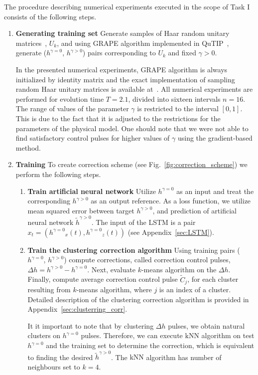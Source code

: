 \documentclass[aps,pra,showkeys,showpacs,notitlepage,superscriptaddress]{revtex4-1}
\newcommand{\1}{{\rm 1\hspace{-0.9mm}l}}
\newcommand{\qutip}{QuTIP\xspace}
\newcommand{\NCP}{\ensuremath{h^{\gamma=0}}\xspace}
\newcommand{\DCP}{\ensuremath{h^{\gamma >0}}\xspace}
\newcommand{\CCP}{\ensuremath{\Delta h}\xspace}
\newcommand{\nnDCP}{\ensuremath{\tilde{h}^{\gamma >0}}\xspace}
\newcommand{\kNN}{\ensuremath{\mathrm{kNN}}\xspace}
\begin{document}
The procedure describing numerical experiments executed in the scope of Task I 
consists of the following steps.
\begin{enumerate}
  \item \textbf{Generating training set}
  Generate samples of Haar random 
  unitary matrices~\cite{mezzadrigenerate,miszczak12generating}, $U_k$, and using GRAPE algorithm implemented in \qutip~\cite{qutip,qutip1,qutip2}, 
  generate (\NCP, \DCP) pairs corresponding to $U_k$ and fixed $\gamma>0$.
  
  In the presented numerical experiments, GRAPE algorithm is always initialized by identity matrix and the exact implementation of sampling random Haar unitary matrices 
  is available at~\cite{qcontrol_lstm_approx}. All numerical experiments are performed for evolution time $T=2.1$, divided into sixteen intervals $n=16$. %
  The range of values of the parameter $\gamma$ is restricted to the interval $[0,1]$. This is due to the fact that it is adjusted to the restrictions for the parameters of the physical model.
  One should note that we were not able to find satisfactory control pulses for higher values of $\gamma$ using the gradient-based method.
  
  \item \textbf{Training} To create correction scheme (see Fig.~\ref{fig:correction_scheme}) we perform the following steps.
  \begin{enumerate}
    \item \textbf{Train artificial neural network} Utilize \NCP as an input and treat the corresponding \DCP as an output reference. As a loss function, we utilize mean squared error between target \DCP, and prediction of artificial neural network \nnDCP. The input of the LSTM is a pair $x_t=(\NCP_x(t),\NCP_z(t))$ (see Appendix~\ref{sec:LSTM}).
    
    \item \textbf{Train the clustering correction algorithm}
    Using training pairs (\NCP, \DCP) compute corrections, called correction control pulses, $\CCP = {\DCP}-{\NCP}$. Next, evaluate $k$-means algorithm on the $\CCP$. Finally, compute average correction control pulse $\tilde{C}_j$, for each cluster resulting from $k$-means algorithm, where $j$ is an index of a cluster.
    Detailed description of the clustering correction algorithm is provided in Appendix~\ref{sec:clusterring_corr}.
    
    It it important to note that by clustering \CCP pulses, we obtain natural clusters on \NCP pulses. Therefore, we can execute \kNN algorithm on test $\NCP$ and the training set to determine the correction, which is equivalent to finding the desired $\nnDCP$. The \kNN algorithm has number of neighbours set to $k=4$.
   

\end{enumerate}
\end{enumerate}
\end{document}
